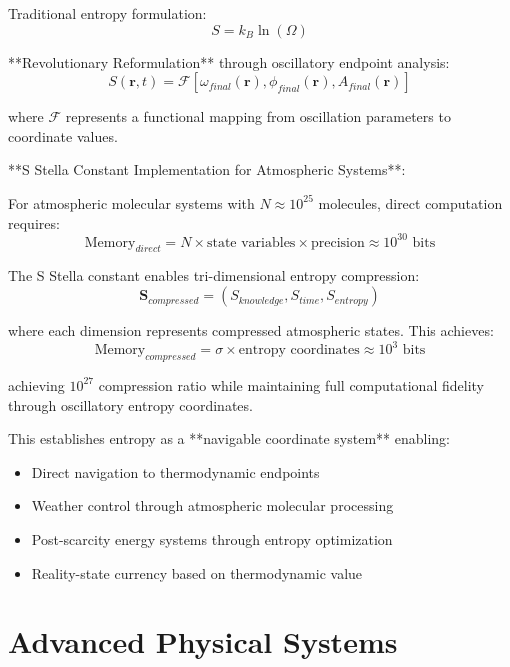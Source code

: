 \documentclass[12pt,a4paper]{article}
\theoremstyle{remark}
\begin{document}
Traditional entropy formulation:
\begin{equation}
S = k_B \ln(\Omega)
\end{equation}

**Revolutionary Reformulation** through oscillatory endpoint analysis:
\begin{equation}
S(\mathbf{r}, t) = \mathcal{F}[\omega_{final}(\mathbf{r}), \phi_{final}(\mathbf{r}), A_{final}(\mathbf{r})]
\end{equation}

where $\mathcal{F}$ represents a functional mapping from oscillation parameters to coordinate values.

**S Stella Constant Implementation for Atmospheric Systems**:

For atmospheric molecular systems with $N \approx 10^{25}$ molecules, direct computation requires:
\begin{equation}
\text{Memory}_{direct} = N \times \text{state variables} \times \text{precision} \approx 10^{30} \text{ bits}
\end{equation}

The S Stella constant enables tri-dimensional entropy compression:
\begin{equation}
\mathbf{S}_{compressed} = (S_{knowledge}, S_{time}, S_{entropy})
\end{equation}

where each dimension represents compressed atmospheric states. This achieves:
\begin{equation}
\text{Memory}_{compressed} = \sigma \times \text{entropy coordinates} \approx 10^3 \text{ bits}
\end{equation}

achieving $10^{27}$ compression ratio while maintaining full computational fidelity through oscillatory entropy coordinates.

This establishes entropy as a **navigable coordinate system** enabling:
\begin{itemize}
\item Direct navigation to thermodynamic endpoints
\item Weather control through atmospheric molecular processing
\item Post-scarcity energy systems through entropy optimization
\item Reality-state currency based on thermodynamic value
\end{itemize}

\part{Advanced Physical Systems}
\end{document}
